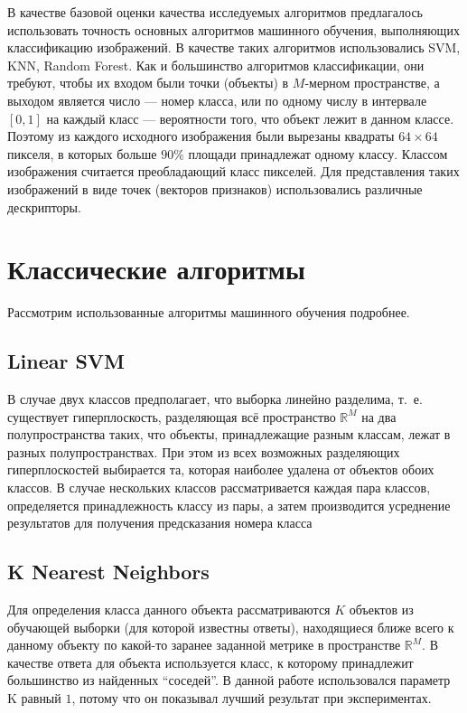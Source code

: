 В качестве базовой оценки качества исследуемых алгоритмов предлагалось
использовать точность основных алгоритмов машинного обучения, выполняющих
классификацию изображений. В качестве таких алгоритмов использовались SVM, KNN,
Random Forest. Как и большинство алгоритмов классификации, они требуют, чтобы их
входом были точки (объекты) в $M$-мерном пространстве, а выходом является
число --- номер класса, или по одному числу в интервале $[0, 1]$ на каждый
класс --- вероятности того, что объект лежит в данном классе. Поэтому из каждого
исходного изображения были вырезаны квадраты $64 \times 64$ пикселя, в которых
больше $90\%$ площади принадлежат одному классу.  Классом изображения считается
преобладающий класс пикселей. Для представления таких изображений в виде точек
(векторов признаков) использовались различные дескрипторы.


\section{Классические алгоритмы}
Рассмотрим использованные алгоритмы машинного обучения подробнее.

\subsection{Linear SVM}
В случае двух классов предполагает, что выборка линейно разделима, т. е.
существует гиперплоскость, разделяющая всё пространство $\mathbb{R}^M$ на два
полупространства таких, что объекты, принадлежащие разным классам, лежат в
разных полупространствах. При этом из всех возможных разделяющих гиперплоскостей
выбирается та, которая наиболее удалена от объектов обоих классов.  В случае
нескольких классов рассматривается каждая пара классов, определяется
принадлежность классу из пары, а затем производится усреднение результатов для
получения предсказания номера класса

\subsection{K Nearest Neighbors}
Для определения класса данного объекта рассматриваются $K$ объектов из обучающей
выборки (для которой известны ответы), находящиеся ближе всего к данному объекту
по какой-то заранее заданной метрике в пространстве $\mathbb{R}^M$. В качестве
ответа для объекта используется класс, к которому принадлежит большинство из
найденных ``соседей''. В данной работе использовался параметр K равный $1$,
потому что он показывал лучший результат при экспериментах.

